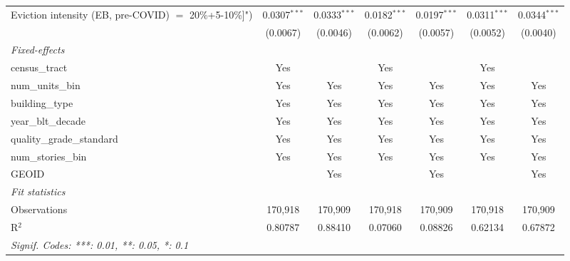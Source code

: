 \documentclass[
  11pt,
]{article}
\begin{document}
\begin{adjustbox}{max width=\textwidth}
\begin{tabular}{lcccccc}
   Eviction intensity (EB, pre-COVID) $=$ 20\%+5-10\%]")       & 0.0307$^{***}$  & 0.0333$^{***}$  & 0.0182$^{***}$  & 0.0197$^{***}$  & 0.0311$^{***}$  & 0.0344$^{***}$\\   
                                                               & (0.0067)        & (0.0046)        & (0.0062)        & (0.0057)        & (0.0052)        & (0.0040)\\   
   \midrule
   \emph{Fixed-effects}\\
   census\_tract                                               & Yes             &                 & Yes             &                 & Yes             & \\  
   num\_units\_bin                                             & Yes             & Yes             & Yes             & Yes             & Yes             & Yes\\  
   building\_type                                              & Yes             & Yes             & Yes             & Yes             & Yes             & Yes\\  
   year\_blt\_decade                                           & Yes             & Yes             & Yes             & Yes             & Yes             & Yes\\  
   quality\_grade\_standard                                    & Yes             & Yes             & Yes             & Yes             & Yes             & Yes\\  
   num\_stories\_bin                                           & Yes             & Yes             & Yes             & Yes             & Yes             & Yes\\  
   GEOID                                                       &                 & Yes             &                 & Yes             &                 & Yes\\  
   \midrule
   \emph{Fit statistics}\\
   Observations                                                & 170,918         & 170,909         & 170,918         & 170,909         & 170,918         & 170,909\\  
   R$^2$                                                       & 0.80787         & 0.88410         & 0.07060         & 0.08826         & 0.62134         & 0.67872\\  
   \midrule \midrule
   \multicolumn{7}{l}{\emph{Signif. Codes: ***: 0.01, **: 0.05, *: 0.1}}\\
\end{tabular}
\par\endgroup

\end{adjustbox}
\end{document}
